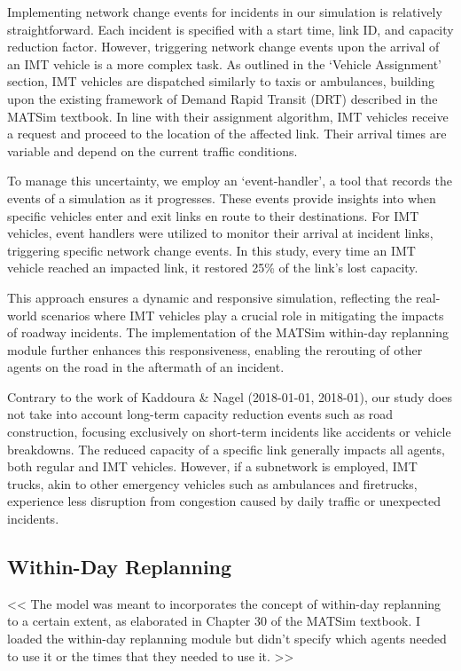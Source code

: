 \documentclass[fancy, oneside, mastersfancy, ms]{byuthesis}
\begin{document}
Implementing network change events for incidents in our simulation is
relatively straightforward. Each incident is specified with a start
time, link ID, and capacity reduction factor. However, triggering
network change events upon the arrival of an IMT vehicle is a more
complex task. As outlined in the `Vehicle Assignment' section, IMT
vehicles are dispatched similarly to taxis or ambulances, building upon
the existing framework of Demand Rapid Transit (DRT) described in the
MATSim textbook. In line with their assignment algorithm, IMT vehicles
receive a request and proceed to the location of the affected link.
Their arrival times are variable and depend on the current traffic
conditions.

To manage this uncertainty, we employ an `event-handler', a tool that
records the events of a simulation as it progresses. These events
provide insights into when specific vehicles enter and exit links en
route to their destinations. For IMT vehicles, event handlers were
utilized to monitor their arrival at incident links, triggering specific
network change events. In this study, every time an IMT vehicle reached
an impacted link, it restored 25\% of the link's lost capacity.

This approach ensures a dynamic and responsive simulation, reflecting
the real-world scenarios where IMT vehicles play a crucial role in
mitigating the impacts of roadway incidents. The implementation of the
MATSim within-day replanning module further enhances this
responsiveness, enabling the rerouting of other agents on the road in
the aftermath of an incident.

Contrary to the work of Kaddoura \& Nagel (2018-01-01, 2018-01), our
study does not take into account long-term capacity reduction events
such as road construction, focusing exclusively on short-term incidents
like accidents or vehicle breakdowns. The reduced capacity of a specific
link generally impacts all agents, both regular and IMT vehicles.
However, if a subnetwork is employed, IMT trucks, akin to other
emergency vehicles such as ambulances and firetrucks, experience less
disruption from congestion caused by daily traffic or unexpected
incidents.

\hypertarget{within-day-replanning}{%
\subsection{Within-Day Replanning}\label{within-day-replanning}}

\textless\textless{} The model was meant to incorporates the concept of
within-day replanning to a certain extent, as elaborated in Chapter 30
of the MATSim textbook. I loaded the within-day replanning module but
didn't specify which agents needed to use it or the times that they
needed to use it. \textgreater\textgreater{}
\end{document}
